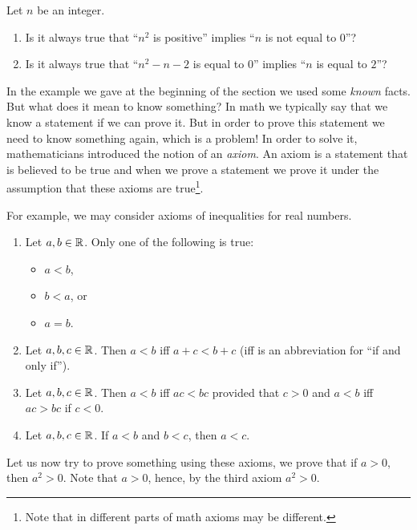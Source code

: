 \begin{exercise}
  Let $n$ be an integer.
  \begin{enumerate}
    \item Is it always true that ``$n^2$ is positive''
      implies ``$n$ is not equal to $0$''?
    \item Is it always true that ``$n^2 - n - 2$ is equal to $0$'' implies
      ``$n$ is equal to $2$''?
  \end{enumerate}
\end{exercise}
In the example we gave at the beginning of the section we used some
\textit{known} facts. But what does it mean to know something? In math we
typically say that we know a statement if we can prove it. But in order to prove
this statement we need to know something again, which is a problem! In order to
solve it, mathematicians introduced the notion of an \textit{axiom}.
An axiom is a statement that is believed to be true and when we prove a statement
we prove it under the assumption that these axioms are true\footnote{Note that
in different parts of math axioms may be different.}.

For example, we may consider axioms of inequalities for real numbers.
\begin{enumerate}
  \item Let $a, b \in \mathbb{R}$. Only one of the following is true:
    \begin{itemize}
      \item $a < b$,
      \item $b < a$, or
      \item $a = b$.
    \end{itemize}
  \item Let $a, b, c \in \mathbb{R}$. Then $a < b$ iff $a + c < b + c$ (iff is an
    abbreviation for ``if and only if'').
  \item Let $a, b, c \in \mathbb{R}$. Then $a < b$ iff $ac < bc$ provided
    that $c > 0$ and $a < b$ iff $ac > bc$ if $c < 0$.
  \item Let $a, b, c \in \mathbb{R}$. If $a < b$ and $b < c$, then $a < c$.
\end{enumerate}



Let us now try to prove something using these axioms, we prove that if $a > 0$,
then $a^2 > 0$. Note that $a > 0$, hence, by the third axiom $a^2 > 0$.

